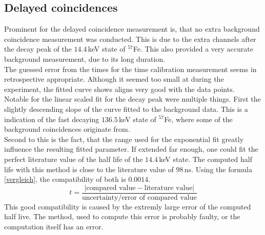\documentclass[30pt,a4paper]{article}
\begin{document}
 	\subsection{Delayed coincidences}
 	Prominent for the delayed coincidence measurement is, that no extra background 
 	coincidence measurement was conducted. This is due to the extra channels after the 
 	decay peak of the $14.4$\,keV state of $^{57}$Fe. This also provided a very accurate
 	background measurement, due to its long duration.\\
 	The guessed error from the times for the time calibration measurement seems in
 	retrospective appropriate. Although it seemed too small at during the experiment,
 	the fitted curve shows aligns very good with the data points.\\
 	Notable for the linear scaled fit for the decay peak were multiple things.
 	First the slightly descending slope of the curve fitted to the background data.
 	This is a indication of the fast decaying $136.5$\,keV state of $^{57}$Fe, where
 	some of the background coincidences originate from.\\
 	Second to this is the fact, that the range used for the exponential fit greatly
 	influence the resulting fitted parameter. If extended far enough, one could fit the
 	perfect literature value of the half life of the $14.4$\,keV state. The computed
 	half life with this method is close to the literature value of $98\,$ns. Using the 
 	formula \ref{vergleich}, the compatibility of both is $0.0014$.
 	\begin{equation}
 		t = \frac{\left|\textrm{compared value}-\textrm{literature value}\right|}{\textrm{uncertainty/error of compared value}}
 		\label{vergleich}
 	\end{equation}
 	This good compatibility
 	is caused by the extremly large error of the computed half live. 
 	The method, used to compute this error is probably faulty, or the computation itself has an error. \\
 	
\end{document}
